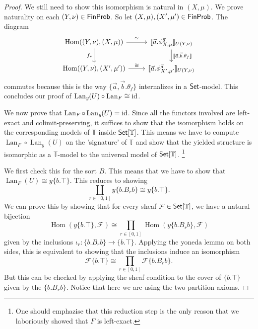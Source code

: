 \documentclass[a4paper]{amsproc}
\theoremstyle{plain}
\theoremstyle{definition}
\theoremstyle{remark}
\numberwithin{equation}{section}
\newcommand{\id}{\textup{id}}
\DeclareMathOperator{\Hom}{Hom}
\newcommand{\y}{\textit{y}}
\DeclareMathOperator{\Lan}{Lan}
\newcommand{\Set}{\textup{\textsf{Set}}}
\newcommand{\FinProb}{\textup{\textsf{FinProb}}}
\newcommand{\ldoub}{[\![}
\newcommand{\rdoub}{]\!]}
\begin{document}
\begin{proof}
We still need to show this isomorphism is natural in $(X,\mu)$. We prove naturality on each $(Y,\nu) \in \FinProb$. So let $(X,\mu), (X',\mu') \in \FinProb$. The diagram
\[
\begin{tikzcd}
    {\Hom((Y,\nu),(X,\mu))} \arrow[r, "\cong"] \arrow[d, "f_*"'] & {\ldoub \vec{a} . \phi^{\vec{a}}_{X,\mu} \rdoub_{U(Y,\nu)}} \arrow[d, "{\ldoub \vec{a},\vec{b} . \theta_f \rdoub}"] \\
    {\Hom((Y,\nu),(X',\mu'))} \arrow[r, "\cong"]                 & {\ldoub \vec{a} . \phi^{\vec{a}}_{X',\mu'} \rdoub_{U(Y,\nu)}}
\end{tikzcd}
\]
commutes because this is the way $\{\vec{a},\vec{b} . \theta_f \}$ internalizes in a $\Set$-model. This concludes our proof of $\Lan_{\y}(U) \circ \Lan_F \cong \id$.

We now prove that $\Lan_F \circ \Lan_{\y}(U) = \id$. Since all the functors involved are left-exact and colimit-preserving, it suffices to show that the isomorphism holds on the corresponding models of $\mathbb{T}$ inside $\Set[\mathbb{T}]$. This means we have to compute $\Lan_F \circ \Lan_{\y}(U)$ on the 'signature' of $\mathbb{T}$ and show that the yielded structure is isomorphic as a $\mathbb{T}$-model to the universal model of $\Set[\mathbb{T}]$. \footnote{One should emphazise that this reduction step is the only reason that we laboriously showed that $F$ is left-exact.}

We first check this for the sort $B$. This means that we have to show that $\Lan_F(U) \cong \y \{b . \top\}$. This reduces to showing
\[
\coprod_{r \in [0,1]} \y \{b . B_r b\} \cong \y \{b . \top\} .
\]
We can prove this by showing that for every sheaf $\mathcal{F} \in \Set[\mathbb{T}]$, we have a natural bijection
\[
\Hom(\y \{b . \top\}, \mathcal{F}) \cong \prod_{r \in [0,1]} \Hom(\y \{b . B_r b\}, \mathcal{F})
\]
given by the inclusions $\iota_r : \{b . B_r b\} \to \{b . \top\}$. Applying the yoneda lemma on both sides, this is equivalent to showing that the inclusions induce an isomorphism
\[
\mathcal{F} \{b . \top\} \cong \prod_{r \in [0,1]} \mathcal{F} \{b . B_r b\} .
\]
But this can be checked by applying the sheaf condition to the cover of $\{b . \top\}$ given by the $\{b . B_r b\}$. Notice that here we are using the two partition axioms.


\end{proof}
\end{document}
